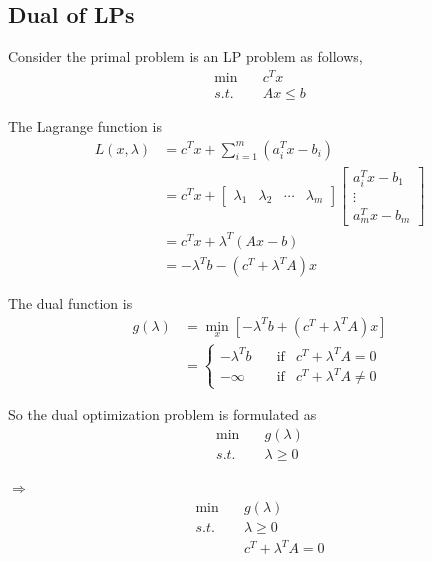 




\vspace{0.5cm}
\subsection{Dual of LPs}
Consider the primal problem is an LP problem as follows,
\begin{align*}
\min\quad &c^Tx\\
s.t.\quad &Ax\leq b
\end{align*}

The Lagrange function is 
\begin{align*}
L(x,\lambda) &= c^Tx + \sum^m_{i=1}(a_i^Tx-b_i)\\
&= c^Tx+\begin{bmatrix}
\lambda_1&\lambda_2&\cdots&\lambda_m
\end{bmatrix}\begin{bmatrix}
a_i^Tx-b_1\\
\vdots\\
a_m^Tx-b_m
\end{bmatrix} \\
&=c^Tx+\lambda^T(Ax-b)\\
&= -\lambda^Tb-(c^T+\lambda^TA)x
\end{align*}

The dual function is
\begin{align*}
g(\lambda) &= \min_x[-\lambda^Tb+(c^T+\lambda^TA)x]\\
&=
\label{eq6}
\left\{
\begin{aligned}
-\lambda^Tb &\quad \text{if} & c^T+\lambda^TA=0 \\
-\infty &\quad \text{if} & c^T+\lambda^TA\neq 0
\end{aligned}
\right.
\end{align*}

So the dual optimization problem is formulated as
\begin{align*}
\min\quad &g(\lambda)\\
s.t.\quad &\lambda \geq 0
\end{align*}

$\Rightarrow$
\begin{align*}
\min\quad &g(\lambda)\\
s.t.\quad &\lambda\geq 0\\
&c^T+\lambda^TA=0
\end{align*}

